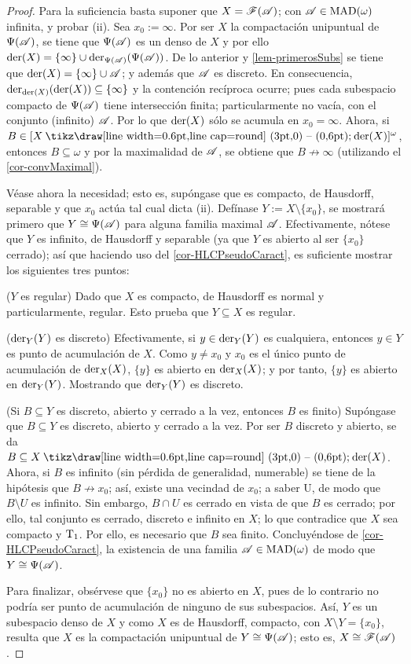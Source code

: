  \begin{proof}
  Para la suficiencia basta suponer que $X=\mathscr{F}(\mathscr{A})$; con $\mathscr{A} \in \operatorname{MAD}(\omega)$ infinita, y probar (ii). Sea $x_0:=\infty$. Por ser $X$ la compactación unipuntual de $\Psi(\mathscr{A})$, se tiene que $\Psi(\mathscr{A})$ es un denso de $X$ y por ello $\operatorname{der}(X) = \{\infty\} \cup \operatorname{der}_{\Psi(\mathscr{A})}(\Psi(\mathscr{A}))$. De lo anterior y \ref{lem-primerosSubs} se tiene que $\operatorname{der}(X) = \{\infty\} \cup \mathscr{A}$; y además que $\mathscr{A}$ es discreto. En consecuencia, $\operatorname{der}_{\operatorname{der}(X)}(\operatorname{der}(X)) \subseteq \{\infty\}$ y la contención recíproca ocurre; pues cada subespacio compacto de $\Psi(\mathscr{A})$ tiene intersección finita; particularmente no vacía, con el conjunto (infinito) $\mathscr{A}$. Por lo que $\operatorname{der}(X)$ sólo se acumula en $x_0=\infty$. Ahora, si $B \in [X \setminus \der(X)]^\omega$, entonces $B \subseteq \omega$ y por la maximalidad de $\mathscr{A}$, se obtiene que $B \not\to \infty$ (utilizando el \autoref{cor-convMaximal}).

  Véase ahora la necesidad; esto es, supóngase que es compacto, de Hausdorff, separable y que $x_0$ actúa tal cual dicta (ii). Defínase $Y:=X\setminus \{x_0\}$, se mostrará primero que $Y \cong \Psi(\mathscr{A})$ para alguna familia maximal $\mathscr{A}$. Efectivamente, nótese que $Y$ es infinito, de Hausdorff y separable (ya que $Y$ es abierto al ser $\{x_0\}$ cerrado); así que haciendo uso del \autoref{cor-HLCPseudoCaract}, es suficiente mostrar los siguientes tres puntos:

  ($Y$ es regular) Dado que $X$ es compacto, de Hausdorff es normal y particularmente, regular. Esto prueba que $Y \subseteq X$ es regular.

  ($\operatorname{der}_Y(Y)$ es discreto) Efectivamente, si $y \in \operatorname{der}_Y(Y)$ es cualquiera, entonces $y \in Y$ es punto de acumulación de $X$. Como $y \neq x_0$ y $x_0$ es el único punto de acumulación de $\operatorname{der}_X(X)$, $\{y\}$ es abierto en $\operatorname{der}_X(X)$; y por tanto, $\{y\}$ es abierto en $\operatorname{der}_Y(Y)$. Mostrando que $\operatorname{der}_Y(Y)$ es discreto.

  (Si $B \subseteq Y$ es discreto, abierto y cerrado a la vez, entonces $B$ es finito) Supóngase que $B \subseteq Y$ es discreto, abierto y cerrado a la vez. Por ser $B$ discreto y abierto, se da $B \subseteq X \setminus \der(X)$. Ahora, si $B$ es infinito (sin pérdida de generalidad, numerable) se tiene de la hipótesis que $B \not\to x_0$; así, existe una vecindad de $x_0$; a saber U, de modo que $B \setminus U$ es infinito. Sin embargo, $B \cap U$ es cerrado en vista de que $B$ es cerrado; por ello, tal conjunto es cerrado, discreto e infinito en $X$; lo que contradice que $X$ sea compacto y $\operatorname{T}_1$. Por ello, es necesario que $B$ sea finito. Concluyéndose de \ref{cor-HLCPseudoCaract}, la existencia de una familia $\mathscr{A}\in\operatorname{MAD}(\omega)$ de modo que $Y \cong \Psi(\mathscr{A})$.

  Para finalizar, obsérvese que $\{x_0\}$ no es abierto en $X$, pues de lo contrario no podría ser punto de acumulación de ninguno de sus subespacios. Así, $Y$ es un subespacio denso de $X$ y como $X$ es de Hausdorff, compacto, con $X \setminus Y = \{x_0\}$, resulta que $X$ es la compactación unipuntual de $Y \cong \Psi(\mathscr{A})$; esto es, $X \cong \mathscr{F}(\mathscr{A})$.
 \end{proof}

